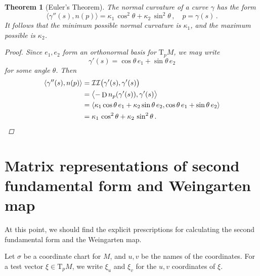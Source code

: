 \documentclass[12pt]{article}
\DeclareMathOperator{\D}{D}
\newcommand{\TpM}{\mathrm{T}_p M}
\newcommand{\ctwo}{\mathcal{II}}
\newtheorem{thm}{Theorem}
\begin{document}
\begin{thm}[Euler's Theorem]
The normal curvature of a curve $\gamma$ has the form
\[
\langle \gamma''(s), n(p) \rangle = \kappa_1 \, \cos^2 \theta + \kappa_2 \, \sin^2 \theta\,, \quad p = \gamma(s)\,.
\]
It follows that the minimum possible normal curvature is $\kappa_1$,
and the maximum possible is $\kappa_2$.
\begin{proof}
Since $e_1, e_2$ form an orthonormal basis for $\TpM$, we may write
\[
\gamma'(s) = \cos \theta \, e_1 + \sin \theta \, e_2
\]
for some angle $\theta$.
Then
\begin{align*}
\langle \gamma''(s), n(p) \rangle &= \ctwo\bigl(\gamma'(s), \gamma'(s) \bigr)
\\
&= \bigl\langle -\D n_p(\gamma'(s)), \gamma'(s) \bigr\rangle \\
&= \langle \kappa_1 \cos \theta \, e_1 + \kappa_2 \sin \theta \, e_2, \cos \theta \, e_1 + \sin \theta \, e_2 \rangle
\\
&= \kappa_1 \, \cos^2 \theta + \kappa_2 \, \sin^2 \theta\,. \qedhere
\end{align*}
\end{proof}
\end{thm}

\section*{Matrix representations of second fundamental form and Weingarten map}

At this point, we should find the explicit prescriptions
for calculating the second fundamental form and the Weingarten map.

Let $\sigma$ be a coordinate chart for $M$,
and $u,v$ be the names of the coordinates.
For a test vector $\xi \in \TpM$, we write $\xi_u$ and $\xi_v$
for the $u,v$ coordinates of $\xi$.
\end{document}
